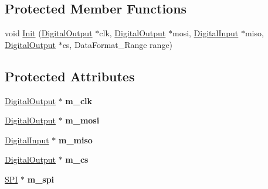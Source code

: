 \subsection*{\-Protected \-Member \-Functions}
\begin{DoxyCompactItemize}
\item 
void \hyperlink{classADXL345__SPI_affcf958cfc98994ea18a796832902ace}{\-Init} (\hyperlink{classDigitalOutput}{\-Digital\-Output} $\ast$clk, \hyperlink{classDigitalOutput}{\-Digital\-Output} $\ast$mosi, \hyperlink{classDigitalInput}{\-Digital\-Input} $\ast$miso, \hyperlink{classDigitalOutput}{\-Digital\-Output} $\ast$cs, \-Data\-Format\-\_\-\-Range range)
\end{DoxyCompactItemize}
\subsection*{\-Protected \-Attributes}
\begin{DoxyCompactItemize}
\item 
\hypertarget{classADXL345__SPI_a4f24d4c77ac13f38eb46ba7ad1e2e5ba}{\hyperlink{classDigitalOutput}{\-Digital\-Output} $\ast$ {\bfseries m\-\_\-clk}}\label{classADXL345__SPI_a4f24d4c77ac13f38eb46ba7ad1e2e5ba}

\item 
\hypertarget{classADXL345__SPI_ac416e3fe7c6324d86ac3707f21ac05fb}{\hyperlink{classDigitalOutput}{\-Digital\-Output} $\ast$ {\bfseries m\-\_\-mosi}}\label{classADXL345__SPI_ac416e3fe7c6324d86ac3707f21ac05fb}

\item 
\hypertarget{classADXL345__SPI_a4d5b0c98d4f5478d23c59d0a8c03608c}{\hyperlink{classDigitalInput}{\-Digital\-Input} $\ast$ {\bfseries m\-\_\-miso}}\label{classADXL345__SPI_a4d5b0c98d4f5478d23c59d0a8c03608c}

\item 
\hypertarget{classADXL345__SPI_acd83d71262f368c3601a745fa39be3bb}{\hyperlink{classDigitalOutput}{\-Digital\-Output} $\ast$ {\bfseries m\-\_\-cs}}\label{classADXL345__SPI_acd83d71262f368c3601a745fa39be3bb}

\item 
\hypertarget{classADXL345__SPI_a9173d0f036436b4dd7ce1a7a4bab7067}{\hyperlink{classSPI}{\-S\-P\-I} $\ast$ {\bfseries m\-\_\-spi}}\label{classADXL345__SPI_a9173d0f036436b4dd7ce1a7a4bab7067}

\end{DoxyCompactItemize}
